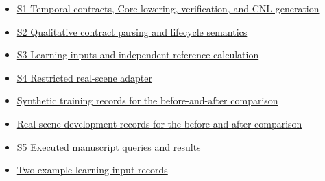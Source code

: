 \documentclass[11pt,a4paper]{article}
\begin{document}
\begin{itemize}\setlength{\itemsep}{0pt}\setlength{\parsep}{0pt}\setlength{\topsep}{2pt}
\item \href{\detokenize{../../../../../../projects/04-guardsynth-coc/experiments/paper1_cnl_learning/temporal_preservation.py}}{S1 Temporal contracts, Core lowering, verification, and CNL generation}
\item \href{\detokenize{../../../../../../platforms/eblc-bcv/src/guard_synth_eblc/action_contract.py}}{S2 Qualitative contract parsing and lifecycle semantics}
\item \href{\detokenize{../../../../../../projects/04-guardsynth-coc/experiments/paper1_cnl_learning/temporal_training_data.py}}{S3 Learning inputs and independent reference calculation}
\item \href{\detokenize{../../../../../../projects/04-guardsynth-coc/src/guard_synth/qualitative_scene_contract.py}}{S4 Restricted real-scene adapter}
\item \href{\detokenize{../temporal-training-data-2026-09-29-001/train_paired.jsonl}}{Synthetic training records for the before-and-after comparison}
\item \href{\detokenize{../../../restricted/guardsynth-eblc-learning-001/speed-development-packaging-2026-09-29-003/l3_admitted_train.jsonl}}{Real-scene development records for the before-and-after comparison}
\item \href{\detokenize{../methodology-2026-09-30-001/manuscript_examples.json}}{S5 Executed manuscript queries and results}
\item \href{\detokenize{../methodology-2026-09-30-001/learning_input_examples.json}}{Two example learning-input records}
\end{itemize}
\endgroup
\end{document}

